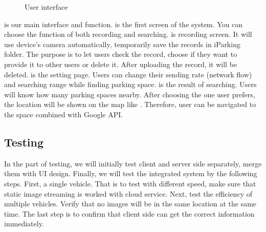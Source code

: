 \documentclass[journal,article,submit,moreauthors,pdftex,10pt,a4paper]{mdpi}
\begin{document}
\begin{figure}[tbp]
{		\label{fig:userResult}
	}
	\hspace{0.1in}
	\caption{User interface}
	\label{fig:userInterface}
\end{figure}

 is our main interface and function.
 is the first screen of the system. You
can choose the function of both recording and searching.
 is recording screen. It will use device's
camera automatically, temporarily save the records in iParking
folder. The purpose is to let users check the
record, choose if they want to provide it to other users or delete it. After
uploading the record, it will be deleted. 
is the setting page. Users can change their sending rate (network flow)
and searching range while finding parking space.
 is the result of searching. Users will know
how many parking spaces nearby. After choosing the one user prefers,
the location will be shown on the map like .
Therefore, user can be navigated to the space combined with Google API.

\subsection{Testing}

In the part of testing, we will initially test client and server side
separately, merge them with UI design. Finally, we will test
the integrated system by the following steps. First, a single vehicle.
That is to test with different speed, make sure that static image
streaming is worked with cloud service. Next, test the efficiency of
multiple vehicles. Verify that no images will be in the same
location at the same time. The last step is to confirm that client side
can get the correct information immediately.
\end{document}
